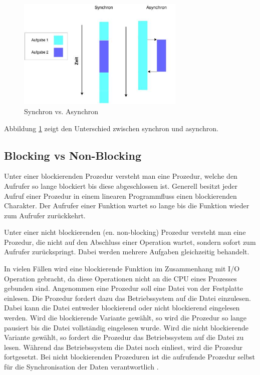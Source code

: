 \begin{figure}[!htb]
  \centering
  \includegraphics[width=8cm]{images/synchron_vs_asynchron.jpg}
  \caption{
    Synchron vs. Asynchron
  }
  \label{figure:syncron_vs_async}
\end{figure}

Abbildung \ref{figure:syncron_vs_async} zeigt den Unterschied zwischen synchron und asynchron. 

\subsection{Blocking vs Non-Blocking}

Unter einer blockierenden Prozedur versteht man eine Prozedur, welche den Aufrufer so lange blockiert bis diese abgeschlossen ist. Generell besitzt jeder Aufruf einer Prozedur in einem linearen Programmfluss einen blockierenden Charakter. Der Aufrufer einer Funktion wartet so lange bis die Funktion wieder zum Aufrufer zurückkehrt. 

Unter einer nicht blockierenden (en. non-blocking) Prozedur versteht man eine Prozedur, die nicht auf den Abschluss einer Operation wartet, sondern sofort zum Aufrufer zurückspringt. Dabei werden mehrere Aufgaben gleichzeitig behandelt.  

In vielen Fällen wird eine blockierende Funktion im Zusammenhang mit I/O Operation gebracht, da diese Operationen nicht an die CPU eines Prozesses gebunden sind. Angenommen eine Prozedur soll eine Datei von der Festplatte einlesen. Die Prozedur fordert dazu das Betriebssystem auf die Datei einzulesen. Dabei kann die Datei entweder blockierend oder nicht blockierend eingelesen werden. Wird die blockierende Variante gewählt, so wird die Prozedur so lange pausiert bis die Datei vollständig eingelesen wurde. Wird die nicht blockierende Variante gewählt, so fordert die Prozedur das Betriebssystem auf die Datei zu lesen. Während das Betriebssystem die Datei noch einliest, wird die Prozedur fortgesetzt. Bei nicht blockierenden Prozeduren ist die aufrufende Prozedur selbst für die Synchronisation der Daten verantwortlich \cite[p. 47]{Erb2012}.

